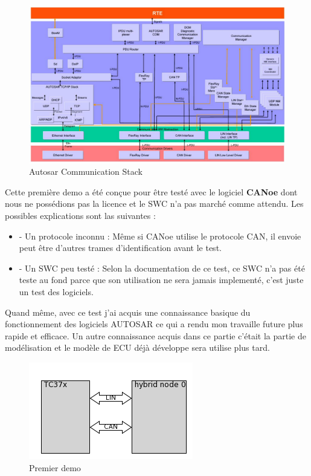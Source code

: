 \begin{figure}[!htb]
 \centering
 \includegraphics[width=\textwidth]{img/autosar_com_stack.png}
 \caption{Autosar Communication Stack\cite{sock_adp_man}}
 \label{fig:autosar-com-stack}
\end{figure}

Cette première demo a \'et\'e con\c cue pour \^etre test\'e avec le logiciel \textbf{CANoe}\cite{canoe} dont nous ne possédions pas la licence et le SWC n'a pas march\'e comme attendu. Les possibles explications sont las suivantes :

\begin{itemize}
    \item - Un protocole inconnu : Même si CANoe utilise le protocole CAN, il envoie peut \^etre d'autres trames d'identification avant le test.
    \item - Un SWC peu test\'e : Selon la documentation de ce test, ce SWC n'a pas \'et\'e teste au fond parce que son utilisation ne sera jamais implement\'e, c'est juste un test des logiciels.
\end{itemize}

Quand même, avec ce test j'ai acquis une connaissance basique du fonctionnement des logiciels AUTOSAR ce qui a rendu mon travaille future plus rapide et efficace. Un autre connaissance acquis dans ce partie c'était la partie de modélisation et le modèle de ECU déjà développe sera utilise plus tard.

\begin{figure}[!htb]
 \centering
 \includegraphics[]{img/first_demo_testbench.png}
 \caption{Premier demo}
 \label{fig:first-demo-diagram}
\end{figure}

